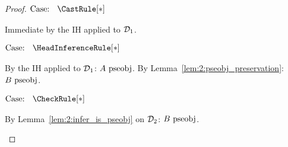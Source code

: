 \begin{proof}
    $\text{Case: }\begin{array}{c} \CastRule[*] \end{array}$
    \begin{proofcase}
        Immediate by the IH applied to $\mathcal{D}_{1}$.
    \end{proofcase}

    $\text{Case: }\begin{array}{c} \HeadInferenceRule[*] \end{array}$
    \begin{proofcase}
        By the IH applied to $\mathcal{D}_{1}$: $A~\mbox{\normalfont pseobj}$.
        By Lemma~\ref{lem:2:pseobj_preservation}: $B~\mbox{\normalfont pseobj}$.
    \end{proofcase}

    $\text{Case: }\begin{array}{c} \CheckRule[*] \end{array}$
    \begin{proofcase}
        By Lemma~\ref{lem:2:infer_is_pseobj} on $\mathcal{D}_{2}$: $B~\mbox{\normalfont pseobj}$.
    \end{proofcase}
\end{proof}

